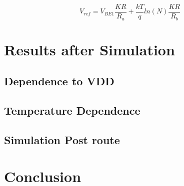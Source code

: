 \documentclass[11pt,a4paper]{report}
\begin{document}
\begin{equation}
  V_{ref} = V_{BE1} \frac{KR}{R_a} + \frac{kT}{q}ln(N) \frac{KR}{R_b} 
  \label{finaleqbdgp}
\end{equation}



\chapter{Results after Simulation}

\section{Dependence to VDD}


\section{Temperature Dependence}


\section{Simulation Post route}




\chapter*{Conclusion}



\begin{appendices}

\end{appendices}

\end{document}
